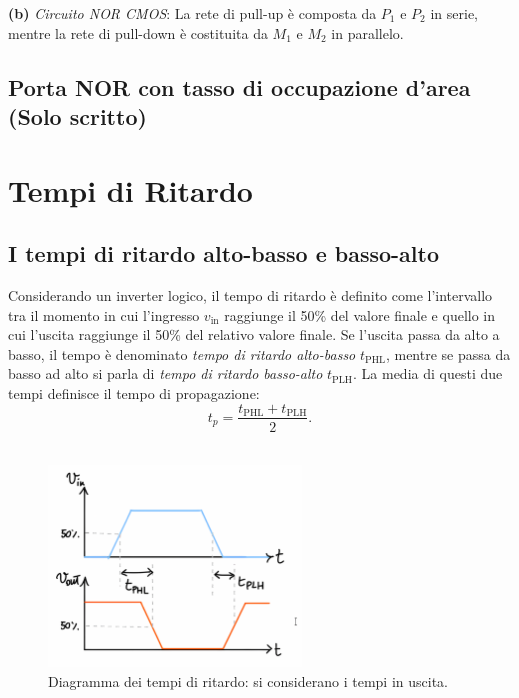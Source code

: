 \bigskip

\textbf{(b)} \textit{Circuito NOR CMOS}: La rete di pull-up è composta da \(P_1\) e \(P_2\) in serie, mentre la rete di pull-down è costituita da \(M_1\) e \(M_2\) in parallelo.

\subsection{Porta NOR con tasso di occupazione d’area (Solo scritto)}
\bigskip

\newpage

\section{Tempi di Ritardo}

\subsection{I tempi di ritardo alto-basso e basso-alto}

Considerando un inverter logico, il tempo di ritardo è definito come l’intervallo tra il momento in cui l’ingresso \(v_{\text{in}}\) raggiunge il 50\% del valore finale e quello in cui l’uscita raggiunge il 50\% del relativo valore finale. Se l’uscita passa da alto a basso, il tempo è denominato \emph{tempo di ritardo alto-basso} \(t_{\text{PHL}}\), mentre se passa da basso ad alto si parla di \emph{tempo di ritardo basso-alto} \(t_{\text{PLH}}\). La media di questi due tempi definisce il tempo di propagazione:
\[
t_p = \frac{t_{\text{PHL}} + t_{\text{PLH}}}{2}.
\]
\\[2mm]
\begin{figure}[H]
    \centering
    \includegraphics[width=0.6\textwidth]{images/2.3.1.1.png}
    \caption{Diagramma dei tempi di ritardo: si considerano i tempi in uscita.}
    \label{fig:tempi_ritardo}
\end{figure}

